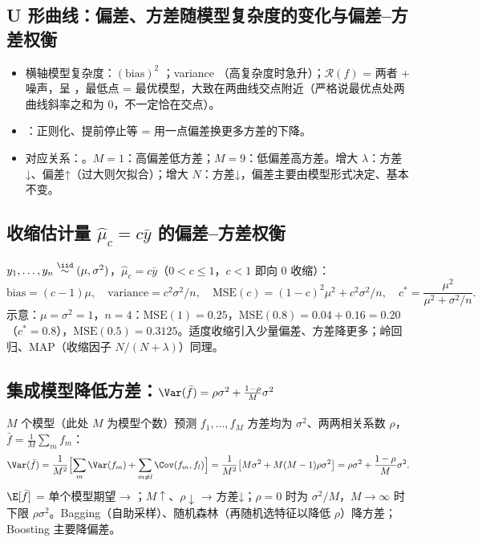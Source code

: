 \subsection{U 形曲线：偏差、方差随模型复杂度的变化与偏差–方差权衡}
\begin{itemize}
\item 横轴模型复杂度：$(\text{bias})^2$ ；variance （高复杂度时急升）；$\mathcal R(f)$ = 两者 + 噪声，呈 ，最低点 = 最优模型，大致在两曲线交点附近（严格说最优点处两曲线斜率之和为 0，不一定恰在交点）。
\item {}：正则化、提前停止等 = 用一点偏差换更多方差的下降。
\item 对应关系：。$M=1$：高偏差低方差；$M=9$：低偏差高方差。增大 $\lambda$：方差↓、偏差↑（过大则欠拟合）；增大 $N$：方差↓，偏差主要由模型形式决定、基本不变。
\end{itemize}

\subsection{收缩估计量 \texorpdfstring{$\hat\mu_c=c\bar y$}{c*ybar} 的偏差–方差权衡}
$y_1,\dots,y_n\overset{\iid}{\sim}(\mu,\sigma^2)$，$\hat\mu_c=c\bar y$（$0<c\le1$，$c<1$ 即向 0 收缩）：
\[
\text{bias}=(c-1)\mu,\quad \text{variance}=c^2\sigma^2/n,\quad
\text{MSE}(c)=(1-c)^2\mu^2+c^2\sigma^2/n,\quad
c^*=\frac{\mu^2}{\mu^2+\sigma^2/n}.
\]
示意：$\mu=\sigma^2=1$，$n=4$：$\text{MSE}(1)=0.25$，$\text{MSE}(0.8)=0.04+0.16=0.20$（$c^*=0.8$），$\text{MSE}(0.5)=0.3125$。适度收缩引入少量偏差、方差降更多；岭回归、MAP（收缩因子 $N/(N+\lambda)$）同理。

\subsection{集成模型降低方差：\texorpdfstring{$\Var(\bar f)=\rho\sigma^2+\frac{1-\rho}{M}\sigma^2$}{Var = rho sigma2 + (1-rho) sigma2 / M}}
$M$ 个模型（此处 $M$ 为模型个数）预测 $f_1,\dots,f_M$ 方差均为 $\sigma^2$、两两相关系数 $\rho$，$\bar f=\frac1M\sum_m f_m$：
\[
\Var(\bar f)=\frac1{M^2}\Bigl[\sum_m\Var(f_m)+\sum_{m\ne l}\Cov(f_m,f_l)\Bigr]
=\frac1{M^2}\bigl[M\sigma^2+M(M-1)\rho\sigma^2\bigr]=\rho\sigma^2+\frac{1-\rho}{M}\sigma^2 .
\]
$\E[\bar f]$ = 单个模型期望 → ；$M\uparrow$、$\rho\downarrow$ → 方差↓；$\rho=0$ 时为 $\sigma^2/M$，$M\to\infty$ 时下限 $\rho\sigma^2$。Bagging（自助采样）、随机森林（再随机选特征以降低 $\rho$）降方差；Boosting 主要降偏差。

